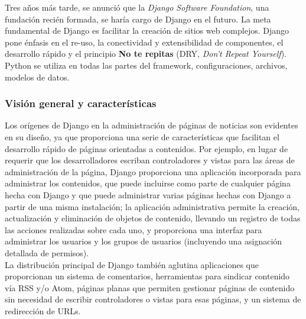 Tres a\~nos m\'as tarde, se anunci\'o que la \textit{Django Software Foundation}, una fundaci\'on reci\'en formada, se har\'ia cargo de Django en el futuro. La meta fundamental de Django es facilitar la creaci\'on de sitios web complejos. Django pone \'enfasis en el re-uso, la conectividad y extensibilidad de componentes, el desarrollo r\'apido y el principio \textbf{No te repitas} (DRY, \textit{Don't Repeat Yourself}).\\

Python se utiliza en todas las partes del framework, configuraciones, archivos, modelos de datos.\\

\subsubsection{Visi\'on general y caracter\'isticas}
Los or\'igenes de Django en la administraci\'on de p\'aginas de noticias son evidentes en su dise\~no, ya que proporciona una serie de caracter\'isticas que facilitan el desarrollo r\'apido de p\'aginas orientadas a contenidos. Por ejemplo, en lugar de requerir que los desarrolladores escriban controladores y vistas para las \'areas de administraci\'on de la p\'agina, Django proporciona una aplicaci\'on incorporada para administrar los contenidos, que puede incluirse como parte de cualquier p\'agina hecha con Django y que puede administrar varias p\'aginas hechas con Django a partir de una misma instalaci\'on; la aplicaci\'on administrativa permite la creaci\'on, actualizaci\'on y eliminaci\'on de objetos de contenido, llevando un registro de todas las acciones realizadas sobre cada uno, y proporciona una interfaz para administrar los usuarios y los grupos de usuarios (incluyendo una asignaci\'on detallada de permisos).\\

La distribuci\'on principal de Django tambi\'en aglutina aplicaciones que proporcionan un sistema de comentarios, herramientas para sindicar contenido v\'ia RSS y/o Atom, p\'aginas planas que permiten gestionar p\'aginas de contenido sin necesidad de escribir controladores o vistas para esas p\'aginas, y un sistema de redirecci\'on de URLs.\\ 

